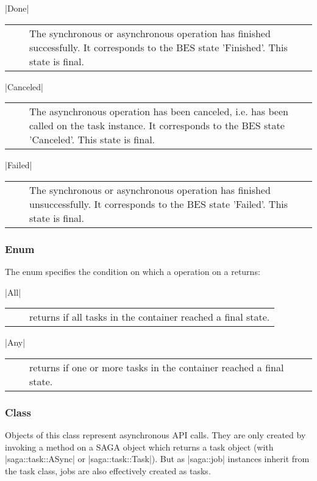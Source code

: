     |Done|\\[1.5mm]
    \begin{tabular}{cp{110mm}}
       ~~ & The synchronous or asynchronous operation has finished
            successfully.  It corresponds to the BES state 'Finished'.
            This state is final.  
    \end{tabular}
 
    |Canceled|\\[1.5mm]
    \begin{tabular}{cp{110mm}}
       ~~ & The asynchronous operation has been canceled, i.e.
            \T{cancel()} has been called on the task instance.  It
            corresponds to the BES state 'Canceled'.  This state is
            final.  
    \end{tabular}
 
    |Failed|\\[1.5mm]
    \begin{tabular}{cp{110mm}}
       ~~ & The synchronous or asynchronous operation has
            finished unsuccessfully.  It corresponds to the BES state
            'Failed'.  This state is final.  
    \end{tabular}
 
 
  \subsubsection*{Enum }
 
    The  enum specifies the condition on
    which a  operation on a 
    returns:
 
    |All|\\[1.5mm]
    \begin{tabular}{cp{110mm}}
       ~~ & \T{wait()} returns if all tasks in the 
            container reached a final state.
    \end{tabular}
    
    |Any|\\[1.5mm]
    \begin{tabular}{cp{110mm}}
       ~~ & \T{wait()} returns if one or more tasks in 
            the container reached a final state.
    \end{tabular}
 
  \subsubsection*{Class }
 
    Objects of this class represent asynchronous API calls.
    They are only created by invoking a method on a SAGA object
    which returns a task object (with |saga::task::ASync| or
    |saga::task::Task|).  But as |saga::job| instances
    inherit from the task class, jobs are also
    effectively created as tasks.
 
